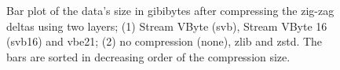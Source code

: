 \begin{figure}
	\centering

	\caption{\label{fig:svb-vbe21-zd-size}Bar plot of the data's size in gibibytes after compressing the zig-zag deltas using two layers; (1) Stream VByte (svb), Stream VByte 16 (svb16) and vbe21; (2) no compression (none), zlib and zstd. The bars are sorted in decreasing order of the compression size.}
\end{figure}
